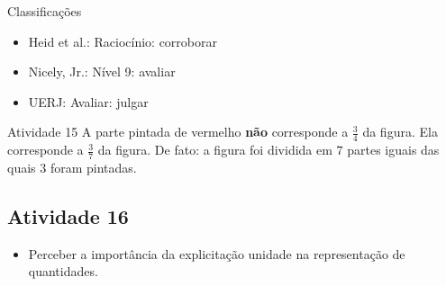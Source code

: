 \begin{multicols}{2}
  Classificações
\begin{itemize} %
    \item       Heid et al.: Raciocínio: corroborar
    \item       Nicely, Jr.: Nível 9: avaliar
    \item       UERJ: Avaliar: julgar
\end{itemize} %


\begin{resposta*}{Atividade 15}
  A parte pintada de vermelho   {\bf não}   corresponde a   $\frac{3}{4}$   da figura. Ela corresponde a   $\frac{3}{7}$   da figura. De fato: a figura foi dividida em   $7$   partes iguais das quais   $3$   foram pintadas.
\end{resposta*}



\subsection{Atividade 16}



  \vspace{.1cm}
  
\begin{itemize} %
    \item       Perceber a importância da explicitação unidade na representação de quantidades.
\end{itemize} %


  \vspace{.1cm} 
  
  \vspace{.1cm}
  

\end{multicols}
